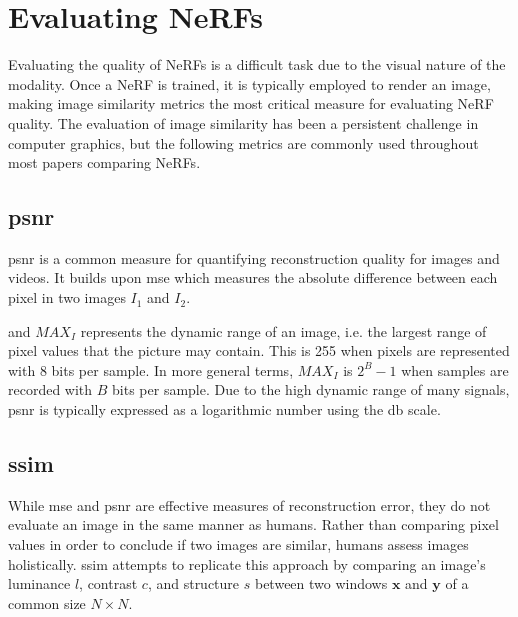



\section{Evaluating NeRFs} \label{sec:evaluating-nerfs} 
Evaluating the quality of NeRFs is a difficult task due to the visual nature of the modality. Once a NeRF is trained, it is typically employed to render an image, making image similarity metrics the most critical measure for evaluating NeRF quality. The evaluation of image similarity has been a persistent challenge in computer graphics, but the following metrics are commonly used throughout most papers comparing NeRFs.


\subsection[PSNR]{\acrfull{psnr}} \label{sec:psnr}
\acrshort{psnr} is a common measure for quantifying reconstruction quality for images and videos. It builds upon \acrfull{mse} which measures the absolute difference between each pixel in two images $I_1$ and $I_2$.



and $MAX_I$ represents the dynamic range of an image, i.e. the largest range of pixel values that the picture may contain. This is 255 when pixels are represented with 8 bits per sample. In more general terms, $MAX_I$ is $2^B-1$ when samples are recorded with $B$ bits per sample. Due to the high dynamic range of many signals, \acrshort{psnr} is typically expressed as a logarithmic number using the \acrfull{db} scale.


\subsection[SSIM]{\acrfull{ssim}}
While \acrshort{mse} and \acrshort{psnr} are effective measures of reconstruction error, they do not evaluate an image in the same manner as humans. Rather than comparing pixel values in order to conclude if two images are similar, humans assess images holistically. \acrshort{ssim} attempts to replicate this approach by comparing an image's luminance $l$, contrast $c$, and structure $s$ between two windows $\pmb{x}$ and $\pmb{y}$ of a common size $N \times N$.

